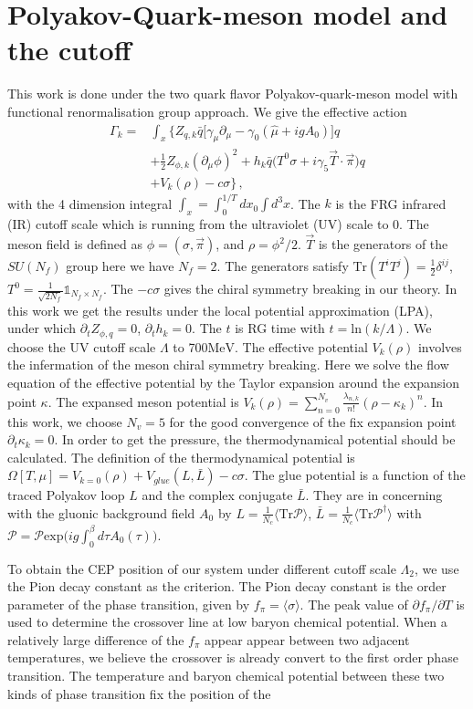 \documentclass[%
reprint,
superscriptaddress,
showpacs,preprintnumbers,
 amsmath,amssymb,
 aps,
prl,
]{revtex4-1}
\begin{document}
\section{Polyakov-Quark-meson model and the cutoff}
\label{sec:pqm}
This work is done under the two quark flavor Polyakov-quark-meson model with functional renormalisation group approach. We give the effective action
\begin{align}
  \Gamma_k=&\int_x \bigg\{Z_{q,k}\bar{q} \Big [\gamma_\mu \partial_\mu -\gamma_0(\hat\mu+igA_0) \Big ]q \nonumber\\[2ex]
  &+\frac{1}{2}Z_{\phi,k}(\partial_\mu \phi)^2\nonumber+h_k\bar{q}\big(T^0\sigma+i\gamma_5\vec{T}\cdot \vec{\pi}\big)q\\[2ex]
  &+V_k(\rho)-c\sigma \bigg\}\,,
\end{align}
with the 4 dimension integral $\int_x=\int^{1/T}_0dx_0\int d^3x$. The $k$ is the FRG infrared (IR) cutoff scale which is running from the ultraviolet (UV) scale to 0. The meson field is defined as $\phi=(\sigma,\vec{\pi})$, and $\rho=\phi^2/2$. $\vec{T}$ is the generators of the $SU(N_f)$ group here we have $N_f=2$. The generators satisfy $\mathrm{Tr}(T^iT^j)=\frac{1}{2}\delta^{ij}$, $T^0=\frac{1}{\sqrt{2N_f}}\mathbb{1}_{N_f\times N_f}$. The $-c\sigma$ gives the chiral symmetry breaking in our theory. In this work we get the results under the local potential approximation (LPA), under which $\partial_tZ_{\phi,q}=0$, $\partial_t h_k=0$. The $t$ is RG time with $t=\mathrm{ln}(k/\Lambda)$. We choose the UV cutoff scale $\Lambda$ to 700$\mathrm{MeV}$. The effective potential $V_k(\rho)$ involves the infermation of the meson chiral symmetry breaking. Here we solve the flow equation of the effective potential by the Taylor expansion around the expansion point $\kappa$. The expansed meson potential is $V_k(\rho)=\sum^{N_v}_{n=0}\frac{\lambda_{n,k}}{n!}(\rho-\kappa_k)^n$. In this work, we choose $N_v=5$ for the good convergence of the fix expansion point $\partial_t\kappa_k=0$. In order to get the pressure, the thermodynamical potential should be calculated. The definition of the thermodynamical potential is $\Omega[T,\mu]=V_{k=0}(\rho)+V_{glue}(L,\bar{L})-c\sigma$. The glue potential is a function of the traced Polyakov loop $L$ and the complex conjugate $\bar{L}$. They are in concerning with the gluonic background field $A_0$ by $L=\frac{1}{N_c}\langle \mathrm{Tr}\mathcal{P}\rangle$, $\bar{L}=\frac{1}{N_c}\langle \mathrm{Tr}\mathcal{P}^\dagger\rangle$ with $\mathcal{P}=\mathcal{P}\mathrm{exp}\big(ig\int^\beta_0d\tau A_0(\tau)\big)$. \par To obtain the CEP position of our system under different cutoff scale $\Lambda_2$, we use the Pion decay constant as the criterion. The Pion decay constant is the order parameter of the phase transition, given by $f_{\pi}=\langle \sigma\rangle$. The peak value of $\partial f_\pi/\partial T$ is used to determine the crossover line at low baryon chemical potential. When a relatively large difference of the $f_\pi$ appear appear between two adjacent temperatures, we believe the crossover is already convert to the first order phase transition. The temperature and baryon chemical potential between these two kinds of phase transition fix the position of the 
\end{document}

